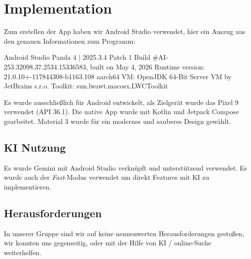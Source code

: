 \section{Implementation}

Zum erstellen der App haben wir Android Studio verwendet, hier ein Auszug aus den genauen Informationen zum Programm:

Android Studio Panda 4 | 2025.3.4 Patch 1
Build \#AI-253.32098.37.2534.15336583, built on May 4, 2026
Runtime version: 21.0.10+-117844308-b1163.108 aarch64
VM: OpenJDK 64-Bit Server VM by JetBrains s.r.o.
Toolkit: sun.lwawt.macosx.LWCToolkit   

Es wurde ausschließlich für Android entwickelt, als Zielgerät wurde das Pixel 9 verwendet (API 36.1). Die native App wurde mit Kotlin und Jetpack Compose gearbeitet. Material 3 wurde für ein modernes und sauberes Design gewählt.

\subsection*{KI Nutzung}

Es wurde Gemini mit Android Studio verknüpft und unterstützend verwendet. Es wurde auch der \emph{Fast}-Modus verwendet um direkt Features mit KI zu implementieren.

\subsection*{Herausforderungen}

In unserer Gruppe sind wir auf keine nennenwerten Herausforderungen gestoßen, wir konnten uns gegenseitig, oder mit der Hilfe von KI / online-Suche weiterhelfen.